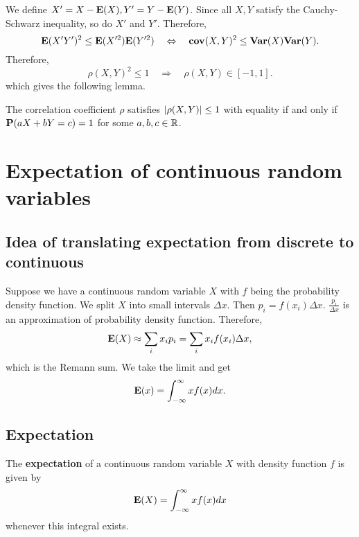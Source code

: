 We define $X' = X-\mathbf{E}(X), Y' = Y - \mathbf{E}(Y)$. Since all $X, Y$ satisfy the Cauchy-Schwarz inequality, so do $X'$ and $Y'$. Therefore, 
\begin{equation*}
    \mathbf{E}(X'Y')^2 \leq \mathbf{E}(X'^2) \mathbf{E}(Y'^2) \quad \Leftrightarrow \quad \mathbf{cov}(X, Y)^2 \leq \mathbf{Var}(X)\mathbf{Var}(Y).
\end{equation*}
Therefore, 
\begin{equation*}
    \rho(X,Y)^2 \leq 1 \quad \Rightarrow \quad \rho(X,Y) \in [-1, 1].
\end{equation*}
which gives the following lemma.

\begin{lemma}
The correlation coefficient $\rho$ satisfies $\left\vert \rho (X, Y)  \right\vert \leq 1$ with equality if and only if $\mathbf{P}(aX + bY = c) = 1$ for some $a, b, c \in \mathbb{R}$. 
\end{lemma}


\section{Expectation of continuous random variables}
\subsection{Idea of translating expectation from discrete to continuous}
Suppose we have a continuous random variable $X$ with $f$ being the probability density function. We split $X$ into small intervals $\Delta x$. Then $p_i = f(x_i)\Delta x$. $\frac{p_i}{\Delta x}$ is an approximation of probability density function. Therefore, 
\begin{equation*}
    \mathbf{E}(X) \approx \sum_{i} x_i p_i = \sum_{i} x_i f(x_i) \Delta x,
\end{equation*}
which is the Remann sum. We take the limit and get
\begin{equation*}
    \mathbf{E}(x) = \int_{-\infty}^\infty x f(x)dx.
\end{equation*}

\subsection{Expectation}
\begin{definition}
The \textbf{expectation} of a continuous random variable $X$ with density function $f$ is given by 
\begin{equation*}
    \mathbf{E}(X) = \int_{-\infty}^\infty xf(x) dx
\end{equation*}
whenever this integral exists.
\end{definition}


